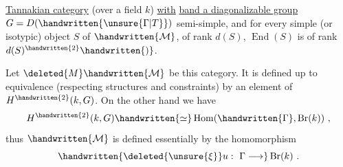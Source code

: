 \uline{Tannakian category} (over a field $k$) \uline{with}  \uline{band a diagonalizable group} $G=D(\handwritten{\unsure{\Gamma|T}})$  semi-simple, and for every simple (or isotypic) object $S$ of $\handwritten{\mathcal{M}}$, of rank $d(S)$, $\operatorname{End}(S)$ is of rank $d(S)^{\handwritten{2}}\handwritten{)}$.

Let $\deleted{M}\handwritten{\mathcal{M}}$ be this category. It is defined up to equivalence (respecting structures and constraints) by an element of $H^{\handwritten{2}}(k,G)$. On the other hand we have
\[
H^{\handwritten{2}}(k,G)\handwritten{\simeq}\operatorname{Hom}(\handwritten{\Gamma},\operatorname{Br}(k))\ ,
\]
thus $\handwritten{\mathcal{M}}$ is defined essentially by the homomorphism 
\[
\handwritten{\deleted{\unsure{\xi}}u:\ \Gamma\longrightarrow}\operatorname{Br}(k)\ .
\]

